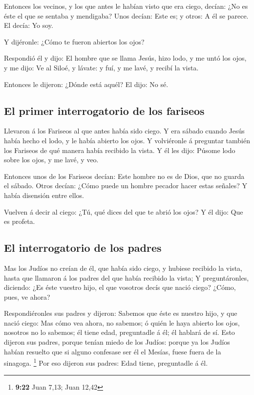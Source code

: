  Entonces los vecinos, y los que antes le habían visto que
era ciego, decían: ¿No es éste el que se sentaba y mendigaba?
 Unos decían: Este es; y otros: A él se parece. El decía: Yo
soy.

 Y dijéronle: ¿Cómo te fueron abiertos los ojos?

 Respondió él y dijo: El hombre que se llama Jesús, hizo
lodo, y me untó los ojos, y me dijo: Ve al Siloé, y lávate: y fuí, y me
lavé, y recibí la vista.

 Entonces le dijeron: ¿Dónde está aquél? El dijo: No sé.

\hypertarget{el-primer-interrogatorio-de-los-fariseos}{%
\subsection{El primer interrogatorio de los
fariseos}\label{el-primer-interrogatorio-de-los-fariseos}}

 Llevaron á los Fariseos al que antes había sido ciego.
 Y era sábado cuando Jesús había hecho el lodo, y le había
abierto los ojos.  Y volviéronle á preguntar también los
Fariseos de qué manera había recibido la vista. Y él les dijo: Púsome
lodo sobre los ojos, y me lavé, y veo.

 Entonces unos de los Fariseos decían: Este hombre no es de
Dios, que no guarda el sábado. Otros decían: ¿Cómo puede un hombre
pecador hacer estas señales? Y había disensión entre ellos.

 Vuelven á decir al ciego: ¿Tú, qué dices del que te abrió
los ojos? Y él dijo: Que es profeta.

\hypertarget{el-interrogatorio-de-los-padres}{%
\subsection{El interrogatorio de los
padres}\label{el-interrogatorio-de-los-padres}}

 Mas los Judíos no creían de él, que había sido ciego, y
hubiese recibido la vista, hasta que llamaron á los padres del que había
recibido la vista;  Y preguntáronles, diciendo: ¿Es éste
vuestro hijo, el que vosotros decís que nació ciego? ¿Cómo, pues, ve
ahora?

 Respondiéronles sus padres y dijeron: Sabemos que éste es
nuestro hijo, y que nació ciego:  Mas cómo vea ahora, no
sabemos; ó quién le haya abierto los ojos, nosotros no lo sabemos; él
tiene edad, preguntadle á él; él hablará de sí.  Esto
dijeron sus padres, porque tenían miedo de los Judíos: porque ya los
Judíos habían resuelto que si alguno confesase ser él el Mesías, fuese
fuera de la sinagoga. \footnote{\textbf{9:22} Juan 7,13; Juan 12,42}
 Por eso dijeron sus padres: Edad tiene, preguntadle á él.

